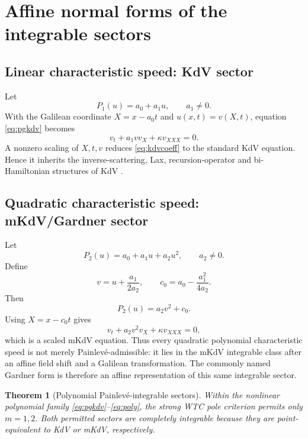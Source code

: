 \documentclass[11pt]{article}
\newtheorem{theorem}{Theorem}[section]
\begin{document}
\section{Affine normal forms of the integrable sectors}
\subsection{Linear characteristic speed: KdV sector}
Let
\[
 P_1(u)=a_0+a_1u,\qquad a_1\ne0.
\]
With the Galilean coordinate $X=x-a_0t$ and $u(x,t)=v(X,t)$, equation \eqref{eq:pgkdv} becomes
\begin{equation}
 v_t+a_1vv_X+\kappa v_{XXX}=0.
 \label{eq:kdvcoeff}
\end{equation}
A nonzero scaling of $X,t,v$ reduces \eqref{eq:kdvcoeff} to the standard KdV equation.  Hence it inherits the inverse-scattering, Lax, recursion-operator and bi-Hamiltonian structures of KdV \citep{gardner1967,miura1968,ablowitz1981,drazin1989}.

\subsection{Quadratic characteristic speed: mKdV/Gardner sector}
Let
\[
 P_2(u)=a_0+a_1u+a_2u^2,\qquad a_2\ne0.
\]
Define
\begin{equation}
 v=u+\frac{a_1}{2a_2},\qquad
 c_0=a_0-\frac{a_1^2}{4a_2}.
 \label{eq:shift}
\end{equation}
Then
\[
 P_2(u)=a_2v^2+c_0.
\]
Using $X=x-c_0t$ gives
\begin{equation}
 v_t+a_2v^2v_X+\kappa v_{XXX}=0,
 \label{eq:mkdvcoeff}
\end{equation}
which is a scaled mKdV equation.  Thus every quadratic polynomial characteristic speed is not merely Painlev\'e-admissible: it lies in the mKdV integrable class after an affine field shift and a Galilean transformation.  The commonly named Gardner form is therefore an affine representation of this same integrable sector.

\begin{theorem}[Polynomial Painlev\'e-integrable sectors]
Within the nonlinear polynomial family \eqref{eq:pgkdv}--\eqref{eq:poly}, the strong WTC pole criterion permits only $m=1,2$.  Both permitted sectors are completely integrable because they are point-equivalent to KdV or mKdV, respectively.
\end{theorem}
\end{document}
